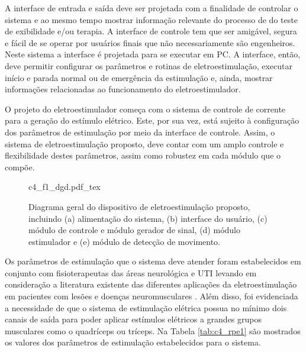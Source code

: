 A interface de entrada e saída deve ser projetada com a finalidade de controlar o sistema e ao mesmo tempo mostrar informação relevante do processo de do teste de exibilidade e/ou terapia. A interface de controle tem que ser amigável, segura e fácil de se operar por usuários finais que não necessariamente são engenheiros. Neste sistema a interface é projetada para se executar em \acrshort{PC}. A interface, então, deve permitir configurar os parâmetros e rotinas de eletroestimulação, executar início e parada normal ou de emergência da estimulação e, ainda, mostrar informações relacionadas ao funcionamento do eletroestimulador.

O projeto do eletroestimulador começa com o sistema de controle de corrente para a geração do estímulo elétrico. Este, por sua vez, está sujeito à configuração dos parâmetros de estimulação por meio da interface de controle. Assim, o sistema de eletroestimulação proposto, deve contar com um amplo controle e flexibilidade destes parâmetros, assim como robustez em cada módulo que o compõe.

\newpage

\begin{figure}[h]
    \centering %
    \small %
    \def\svgwidth{0.9\columnwidth}%
    {c4_f1_dgd.pdf_tex}
    \caption{Diagrama geral do dispositivo de eletroestimulação proposto, incluindo (a) alimentação do sistema, (b) interface do usuário, (c) módulo de controle e módulo gerador de sinal, (d) módulo estimulador e (e) módulo de detecção de movimento.}
    \label{fig:c4_f1_dgd}
\end{figure}

Os parâmetros de estimulação que o sistema deve atender foram estabelecidos em conjunto com fisioterapeutas das áreas neurológica e \acrshort{UTI} levando em consideração a literatura existente das diferentes aplicações da eletroestimulação em pacientes com lesões e doenças neuromusculares \cite{Silva2016SafetyStudy., Carolina2016EfeitosResumo}. Além disso, foi evidenciada a necessidade de que o sistema de estimulação elétrica possua no mínimo dois canais de saída para poder aplicar estímulos elétricos a  grandes grupos musculares como o quadríceps ou tríceps. Na Tabela \ref{tab:c4_rpe1} são mostrados os valores dos parâmetros de estimulação estabelecidos para o sistema.


